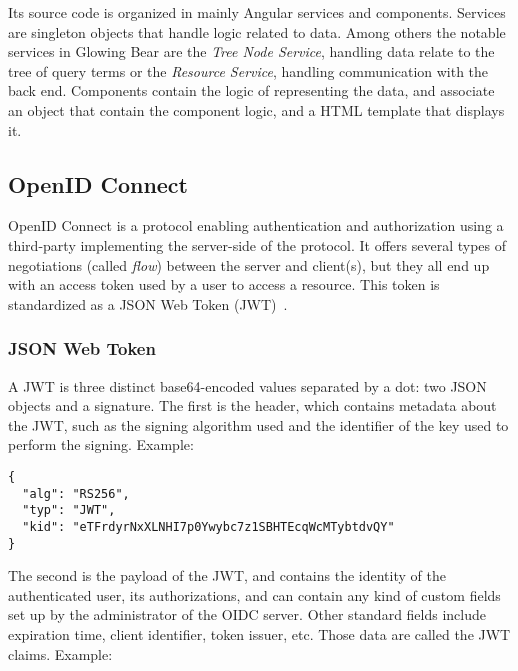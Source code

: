 Its source code is organized in mainly Angular services and components.
Services are singleton objects that handle logic related to data.
Among others the notable services in Glowing Bear are the \emph{Tree Node Service}, handling data relate to the tree of query terms or the \emph{Resource Service}, handling communication with the back end.
Components contain the logic of representing the data, and associate an object that contain the component logic, and a HTML template that displays it.


\subsection{OpenID Connect}
\label{sec:bg-oidc}



OpenID Connect is a protocol enabling authentication and authorization using a third-party implementing the server-side of the protocol.
It offers several types of negotiations (called \emph{flow}) between the server and client(s), but they all end up with an access token used by a user to access a resource.
This token is standardized as a JSON Web Token (JWT)~\cite{rfc:jwt}.

\subsubsection*{JSON Web Token}

A JWT is three distinct base64-encoded values separated by a dot: two JSON objects and a signature.
The first is the header, which contains metadata about the JWT, such as the signing algorithm used and the identifier of the key used to perform the signing.
Example:

\begin{samepage}
\begin{verbatim}
{
  "alg": "RS256",
  "typ": "JWT",
  "kid": "eTFrdyrNxXLNHI7p0Ywybc7z1SBHTEcqWcMTybtdvQY"
}
\end{verbatim}
\end{samepage}

The second is the payload of the JWT, and contains the identity of the authenticated user, its authorizations, and can contain any kind of custom fields set up by the administrator of the OIDC server.
Other standard fields include expiration time, client identifier, token issuer, etc.
Those data are called the JWT claims.
Example:


